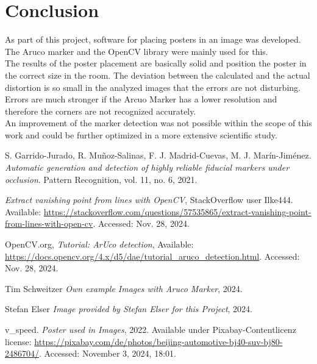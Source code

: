 \documentclass[a4paper,twocolumn]{article}
\begin{document}
\pagebreak
\section{Conclusion}

As part of this project, software for placing posters in an image was developed. The Aruco marker and the OpenCV library were mainly used for this.
\\
The results of the poster placement are basically solid and position the poster in the correct size in the room. The deviation between the calculated and the actual distortion is so small in the analyzed images that the errors are not disturbing. Errors are much stronger if the Arcuo Marker has a lower resolution and therefore the corners are not recognized accurately.
\\
An improvement of the marker detection was not possible within the scope of this work and could be further optimized in a more extensive scientific study.

\begin{thebibliography}{9}

    S. Garrido-Jurado, R. Muñoz-Salinas, F. J. Madrid-Cuevas, M. J. Marín-Jiménez. 
    \textit{Automatic generation and detection of highly reliable fiducial markers under occlusion}. 
    Pattern Recognition, vol. 11, no. 6, 2021.
    
    \textit{Extract vanishing point from lines with OpenCV}, 
    StackOverflow user Ilke444. Available: \url{https://stackoverflow.com/questions/57535865/extract-vanishing-point-from-lines-with-open-cv}. 
    Accessed: Nov. 28, 2024.

    OpenCV.org, 
    \textit{Tutorial: ArUco detection}, 
    Available: \url{https://docs.opencv.org/4.x/d5/dae/tutorial_aruco_detection.html}. 
    Accessed: Nov. 28, 2024.

    Tim Schweitzer \textit{Own example Images with Aruco Marker}, 2024.

    Stefan Elser \textit{Image provided by Stefan Elser for this Project}, 2024.

    v\_speed. \textit{Poster used in Images}, 2022. Available under Pixabay-Contentlicenz license: \url{https://pixabay.com/de/photos/beijing-automotive-bj40-suv-bj80-2486704/}. Accessed: November 3, 2024, 18:01.

\end{thebibliography}
\end{document}
